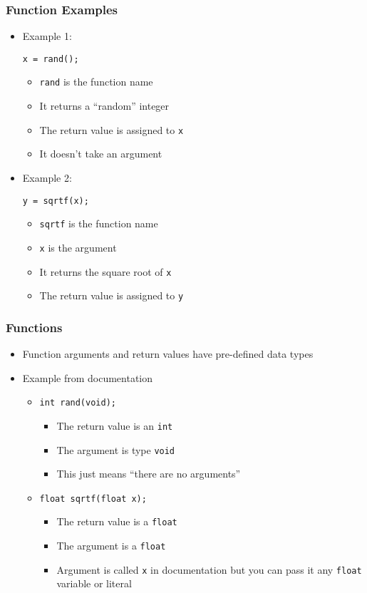 \documentclass[14pt]{beamer}
\begin{document}
\begin{frame}[fragile]
\frametitle{Function Examples}
\begin{itemize}
\item Example 1:
\begin{lstlisting}[style=CStyle]
x = rand();
\end{lstlisting}
	\begin{itemize}
		\item \texttt{rand} is the function name
		\item It returns a ``random'' integer
		\item The return value is assigned to \texttt{x}
		\item It doesn't take an argument 	
	\end{itemize}
\pause
\item Example 2:
\begin{lstlisting}[style=CStyle]
y = sqrtf(x);
\end{lstlisting}
	\begin{itemize}
		\item \texttt{sqrtf} is the function name
		\item \texttt{x} is the argument
		\item It returns the square root of \texttt{x}
		\item The return value is assigned to \texttt{y}
	\end{itemize}
\end{itemize}
\end{frame}

\begin{frame}
\frametitle{Functions}
\begin{itemize}
\item Function arguments and return values have pre-defined data types
\pause
\item Example from documentation
\begin{itemize}
\item \texttt{int~rand(void);}
	\begin{itemize}
		\item The return value is an \texttt{int}
		\item The argument is type \texttt{void}
		\item This just means ``there are no arguments''
	\end{itemize}
\pause
\item \texttt{float sqrtf(float x);}
	\begin{itemize}
		\item The return value is a \texttt{float}
		\item The argument is a \texttt{float}
		\item Argument is called \texttt{x} in documentation but you can pass it any \texttt{float} variable or literal
	\end{itemize}
\end{itemize}
\end{itemize}
\end{frame}
\end{document}
